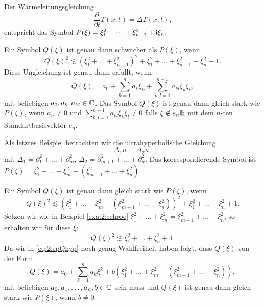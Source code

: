 \begin{exa}\label{exa:2:heat}
Der Wärmeleitungsgleichung
\begin{equation}
\frac{\partial}{\partial t}T(x,t)=\Delta T(x,t),
\end{equation}
entspricht das Symbol $P(\xi)=\xi^2_1+\dots+\xi^2_{n-1}+\mathrm i\xi_n$.

Ein Symbol $Q(\xi)$ ist genau dann schwächer als $P(\xi)$, wenn
\begin{equation}
Q(\xi)^2\apprle(\xi^2_1+\dots+\xi^2_{n-1})^2+\xi^2_1+\dots+\xi^2_{n-1}+\xi^2_n+1.
\end{equation}
Diese Ungleichung ist genau dann erfüllt, wenn
\begin{equation}
Q(\xi)=a_0+\sum_{k=1}^na_k\xi_k+\sum_{k,l=1}^{n-1}a_{kl}\xi_k\xi_l,
\end{equation}
mit beliebigen $a_0,a_k,a_{kl}\in\mathbb C$.
Das Symbol $Q(\xi)$ ist genau dann gleich stark wie $P(\xi)$,
wenn $a_n\neq0$ und $\sum_{k,l=1}^{n-1}a_{kl}\xi_k\xi_l\neq0$ falls $\xi\notin e_n\mathbb R$
mit dem $n$-ten Standartbasisvektor $e_n$.
\end{exa}

\begin{exa}\label{exa:2:hyper}
Als letztes Beispiel betrachten wir die ultrahyperbolische Gleichung
\begin{equation}
\Delta_1u=\Delta_2u,
\end{equation}
mit $\Delta_1=\partial_1^2+\dots+\partial_m^2$, $\Delta_2=\partial^2_{m+1}+\dots+\partial^2_n$.
Das korrespondierende Symbol ist $P(\xi)=\xi^2_1+\dots+\xi^2_m-(\xi^2_{m+1}+\dots+\xi^2_n)$.

Ein Symbol $Q(\xi)$ ist genau dann gleich stark wie $P(\xi)$,
wenn
\begin{equation}
Q(\xi)^2\apprle(\xi^2_1+\dots+\xi^2_m-(\xi^2_{m+1}+\dots+\xi^2_n))^2+\xi^2_1+\dots+\xi^2_n+1.
\end{equation}
Setzen wir wie in Beispiel \ref{exa:2:schroe} $\xi^2_1+\dots+\xi^2_m=\xi^2_{m+1}+\dots+\xi^2_n$,
so erhalten wir für diese $\xi$:
\begin{equation}\label{eq:2:rpQhyp}
Q(\xi)^2\apprle\xi^2_1+\dots+\xi^2_n+1.
\end{equation}
Da wir in \eqref{eq:2:rpQhyp} noch genug Wahlfreiheit haben folgt,
dass $Q(\xi)$ von der Form
\begin{equation}
Q(\xi)=a_0+\sum_{k=1}^na_k\xi^k+b(\xi_1^2+\dots+\xi^2_m-(\xi^2_{m+1}+\dots+\xi^2_n)),
\end{equation}
mit beliebigen $a_0,a_1,\dots,a_n,b\in\mathbb C$ sein muss
und $Q(\xi)$ ist genau dann gleich stark wie $P(\xi)$,
wenn $b\neq0$.
\end{exa}

